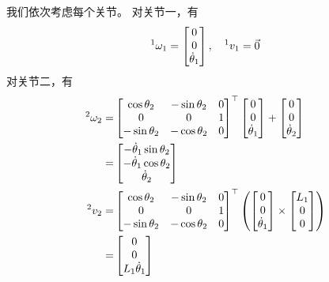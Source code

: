 \documentclass{ctexart}
\begin{document}
我们依次考虑每个关节。
对关节一，有
\[
    \prescript{1}{}{\omega_1} = \begin{bmatrix}
        0 \\ 0 \\ \dot \theta_1
    \end{bmatrix}, \quad
    \prescript{1}{}{v_1} = \vec 0
\]
对关节二，有
\[
    \begin{aligned}
    \prescript{2}{}{\omega_2} = & 
    \begin{bmatrix}
        \cos \theta_2 & - \sin \theta_2 & 0  \\
        0 & 0 & 1 \\
        -\sin \theta_2 & - \cos \theta_2 & 0
    \end{bmatrix}^\top 
    \begin{bmatrix}
        0 \\ 0 \\ \dot \theta_1
    \end{bmatrix} +
    \begin{bmatrix}
        0 \\ 0 \\ \dot \theta_2
    \end{bmatrix} \\
    = & \begin{bmatrix}
        -\dot \theta_1 \sin\theta_2 \\
        -\dot \theta_1 \cos\theta_2 \\
        \dot \theta_2
    \end{bmatrix} \\
    \prescript{2}{}{v_2} = &
    \begin{bmatrix}
        \cos \theta_2 & - \sin \theta_2 & 0  \\
        0 & 0 & 1 \\
        -\sin \theta_2 & - \cos \theta_2 & 0
    \end{bmatrix}^\top 
    \left(
        \begin{bmatrix}
            0 \\ 0 \\ \dot \theta_1
        \end{bmatrix}
        \times
        \begin{bmatrix}
           L_1 \\ 0 \\ 0 
        \end{bmatrix}
    \right) \\ = & \begin{bmatrix}
        0 \\ 0 \\ L_1 \dot\theta_1
    \end{bmatrix}
    \end{aligned}
\]
\end{document}

